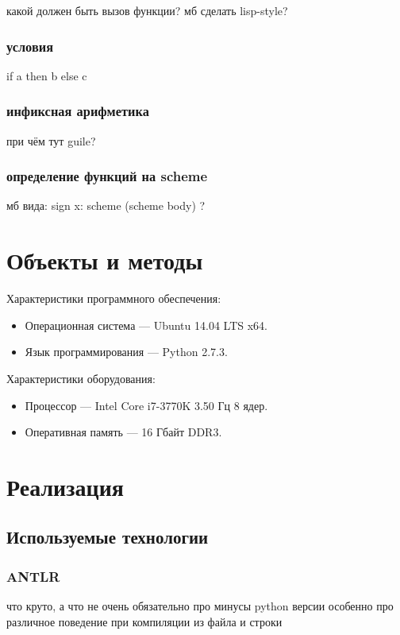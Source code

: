 \documentclass[12pt,a4paper,oneside]{extarticle}
\begin{document}
            какой должен быть вызов функции? мб сделать lisp-style?
        \subsubsection{условия}
            if a then b else c

        \subsubsection{инфиксная арифметика}
            при чём тут guile?
        \subsubsection{определение функций на scheme}
            мб вида: sign x: scheme (scheme body) ?
        
\clearpage

\section{Объекты и методы}
\label{sec:configuration} 
        \noindent Характеристики программного обеспечения:
        \begin{itemize}
            \item Операционная система --- Ubuntu 14.04 LTS x64.
            \item Язык программирования --- Python 2.7.3.
        \end{itemize}
        
        \noindent Характеристики оборудования:
        \begin{itemize}
            \item Процессор --- Intel Core i7-3770K 3.50 Гц 8 ядер.
            \item Оперативная память --- 16 Гбайт DDR3.
        \end{itemize}
\clearpage

\section{Реализация}
    \subsection{Используемые технологии}
        \subsubsection{ANTLR}
            что круто, а что не очень
            обязательно про минусы python версии
            особенно про различное поведение при компиляции из файла и строки %
\end{document}
